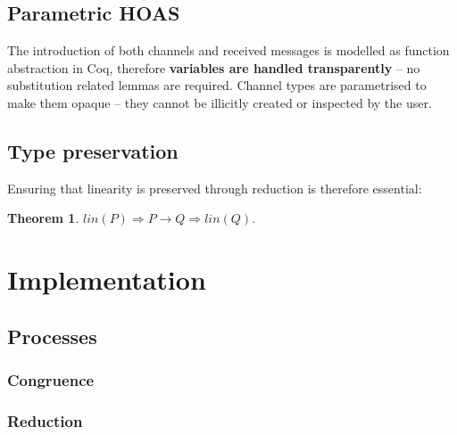 \documentclass{mproj}
\newtheorem{theorem}{Theorem}
\begin{document}
\section{Parametric HOAS}\label{phoas}

\cite{Wadler1989}
\cite{Chlipala2008}

The introduction of both channels and received messages is modelled as function
abstraction in Coq, therefore \textbf{variables are handled transparently} -- no
substitution related lemmas are required. Channel types are parametrised to make
them opaque -- they cannot be illicitly created or inspected by the user.

\section{Type preservation}\label{type-preservation}

Ensuring that linearity is preserved through reduction is therefore essential:
\begin{theorem}
    $lin(P) \Rightarrow P \rightarrow Q \Rightarrow lin(Q).$
\end{theorem}

\chapter{Implementation}\label{implementation}

\section{Processes}\label{processes}
\subsection{Congruence}
\subsection{Reduction}
\end{document}
